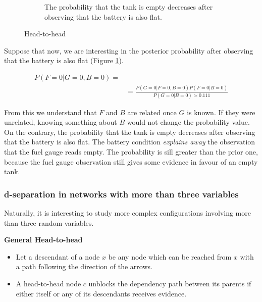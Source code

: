 \begin{figure}
\begin{subfigure}[t]{0.32\textwidth}
\caption{The probability that the tank is empty decreases after observing that the battery is also flat.}
\label{fig:fuelExampleSelectedPart2}
\end{subfigure}

\caption{Head-to-head}
\label{fig:head-to-head-example}
\end{figure}

Suppose that now, we are interesting in the posterior probability after observing that the battery is also flat (Figure \ref{fig:fuelExampleSelectedPart2}).

\begin{align*}
P(F=0 | G=0, B=0) = \\
&=\frac{P(G=0|F=0,B=0)P(F=0|B=0)}{P(G=0|B=0) \simeq 0.111}
\end{align*}

From this we understand that $F$ and $B$ are related once $G$ is known. If they were unrelated, knowing something about $B$ would not change the probability value. On the contrary, the probability that the tank is empty decreases after observing that the battery is also flat. The battery condition \textit{explains away} the observation that the fuel gauge reads empty. The probability is sill greater than the prior one, because the fuel gauge observation still gives some evidence in favour of an empty tank.

\subsubsection{d-separation in networks with more than three variables}
Naturally, it is interesting to study more complex configurations involving more than three random variables. \newline

\textbf{General Head-to-head}
\begin{itemize}
    \item Let a descendant of a node $x$ be any node which can be reached from $x$ with a path following the direction of the arrows.
    \item A head-to-head node $c$ unblocks the dependency path between its parents if either itself or any of its descendants receives evidence.
\end{itemize}

